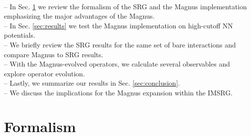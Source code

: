 \documentclass[preprintnumbers,floatfix,aps,prc,preprint,nofootinbib]{revtex4-1}
\begin{document}
\\
-- In Sec. \ref{sec:formalism} we review the formalism of the SRG and the Magnus implementation emphasizing the major advantages of the Magnus.
\\
-- In Sec. \ref{sec:results} we test the Magnus implementation on high-cutoff NN potentials.
\\
-- We briefly review the SRG results for the same set of bare interactions and compare Magnus to SRG results.
\\
-- With the Magnus-evolved operators, we calculate several observables and explore operator evolution.
\\
-- Lastly, we summarize our results in Sec. \ref{sec:conclusion}.
\\
-- We discuss the implications for the Magnus expansion within the IMSRG.


\section{Formalism}
\label{sec:formalism}
\end{document}

